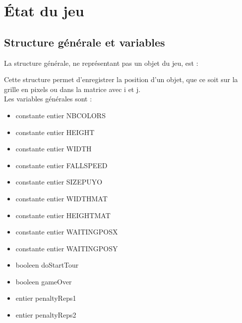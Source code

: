 \documentclass[11pt, final]{report}
\begin{document}
\section{État du jeu}
\subsection{Structure générale et variables}

La structure générale, ne représentant pas un objet du jeu, est : 


Cette structure permet d'enregistrer la position d'un objet, que ce soit sur la grille en pixels ou dans la matrice avec i et j. 
\\

Les variables générales sont : 
\begin{itemize}
\item constante entier NBCOLORS 
\item constante entier HEIGHT
\item constante entier WIDTH
\item constante entier FALLSPEED 
\item constante entier SIZEPUYO
\item constante entier WIDTHMAT
\item constante entier HEIGHTMAT
\item constante entier WAITINGPOSX
\item constante entier WAITINGPOSY
\item booleen doStartTour
\item booleen gameOver
\item entier penaltyReps1
\item entier penaltyReps2
\\
\end{itemize}
\end{document}
